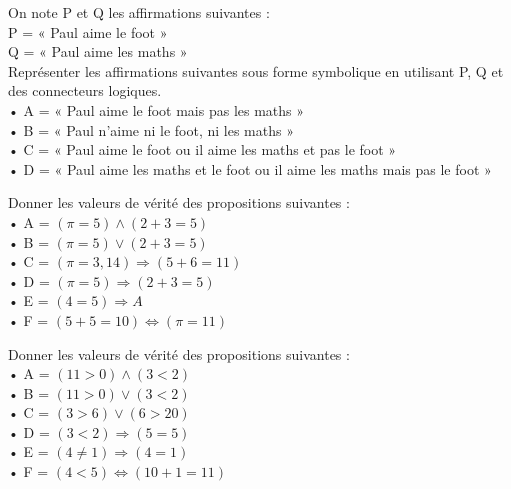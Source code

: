 \begin{exercice}[]
	On note P et Q les affirmations suivantes :\\
	P = « Paul aime le foot  »\\
	Q = « Paul aime les maths  »\\
	Représenter les affirmations suivantes sous forme symbolique en utilisant P, Q et des
	connecteurs logiques.\\
	• A = « Paul aime le foot mais pas les maths  »\\
	• B = « Paul n'aime ni le foot, ni les maths »\\
	• C = « Paul aime le foot ou il aime les maths et pas le foot  »\\
	• D = « Paul aime les maths et le foot ou il aime les maths mais pas le foot  »\\
\end{exercice}

\begin{exercice}[]
	Donner les valeurs de vérité des propositions suivantes :\\
	• A = $(\pi = 5)\wedge(2 + 3 = 5)$\\
	• B = $(\pi = 5)\vee( 2 + 3 = 5)$\\
	• C = $(\pi=3,14)\Rightarrow (5+6=11)$\\
	• D = $(\pi=5)\Rightarrow(2 +3=5)$\\
	• E = $(4 = 5)\Rightarrow A$\\
	• F = $(5+5=10)\Leftrightarrow(\pi=11)$
\end{exercice}

\begin{exercice}
	Donner les valeurs de vérité des propositions suivantes :\\
	• A = $(11>0)\wedge(3<2)$\\
	• B = $(11>0)\vee( 3 <2)$\\
	• C = $(3>6)\vee (6>20)$\\
	• D = $(3<2)\Rightarrow(5=5)$\\
	• E = $(4 \neq 1)\Rightarrow (4=1)$\\
	• F = $(4<5)\Leftrightarrow(10+1=11)$
\end{exercice}



